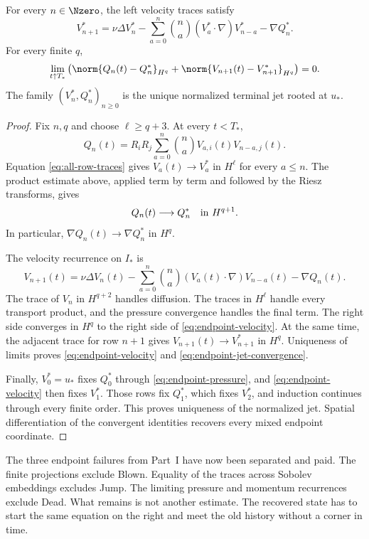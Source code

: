 \begin{proposition}
\label{prop:endpoint-jet}
For every \(n\in\Nzero\), the left velocity traces satisfy
\begin{equation}
 V_{n+1}^*
 =\nu\Delta V_n^*
 -\sum_{a=0}^{n}\binom na
 (V_a^*\cdot\nabla)V_{n-a}^*
 -\nabla Q_n^*.
 \label{eq:endpoint-velocity}
\end{equation}
For every finite \(q\),
\begin{equation}
 \lim_{t\uparrow T_*}
 \left(
  \norm{Q_n(t)-Q_n^*}_{H^q}
  +\norm{V_{n+1}(t)-V_{n+1}^*}_{H^q}
 \right)=0.
 \label{eq:endpoint-jet-convergence}
\end{equation}
The family \((V_n^*,Q_n^*)_{n\ge0}\) is the unique normalized terminal jet
rooted at \(u_*\).
\end{proposition}

\begin{proof}
Fix \(n,q\) and choose \(\ell\ge q+3\).  At every \(t<T_*\),
\[
 Q_n(t)=R_iR_j\sum_{a=0}^{n}\binom na
 V_{a,i}(t)V_{n-a,j}(t).
\]
Equation \eqref{eq:all-row-traces} gives
\(V_a(t)\to V_a^*\) in \(H^\ell\) for every \(a\le n\).  The product
estimate above, applied term by term and followed by the Riesz transforms,
gives
\[
 Q_n(t)\longrightarrow Q_n^*
 \quad\hbox{in }H^{q+1}.
\]
In particular, \(\nabla Q_n(t)\to\nabla Q_n^*\) in \(H^q\).

The velocity recurrence on \(I_*\) is
\[
 V_{n+1}(t)
 =\nu\Delta V_n(t)
 -\sum_{a=0}^{n}\binom na
 (V_a(t)\cdot\nabla)V_{n-a}(t)
 -\nabla Q_n(t).
\]
The trace of \(V_n\) in \(H^{q+2}\) handles diffusion.  The traces in
\(H^\ell\) handle every transport product, and the pressure convergence
handles the final term.  The right side converges in \(H^q\) to the right
side of \eqref{eq:endpoint-velocity}.  At the same time, the adjacent trace
for row \(n+1\) gives
\(V_{n+1}(t)\to V_{n+1}^*\) in \(H^q\).  Uniqueness of limits proves
\eqref{eq:endpoint-velocity} and \eqref{eq:endpoint-jet-convergence}.

Finally, \(V_0^*=u_*\) fixes \(Q_0^*\) through
\eqref{eq:endpoint-pressure}, and \eqref{eq:endpoint-velocity} then fixes
\(V_1^*\).  Those rows fix \(Q_1^*\), which fixes \(V_2^*\), and induction
continues through every finite order.  This proves uniqueness of the normalized
jet.  Spatial differentiation of the convergent identities recovers every
mixed endpoint coordinate.
\end{proof}

The three endpoint failures from Part~I have now been separated and paid.
The finite projections exclude Blown.  Equality of the traces across Sobolev
embeddings excludes Jump.  The limiting pressure and momentum recurrences
exclude Dead.  What remains is not another estimate.  The recovered state has
to start the same equation on the right and meet the old history without a
corner in time.

